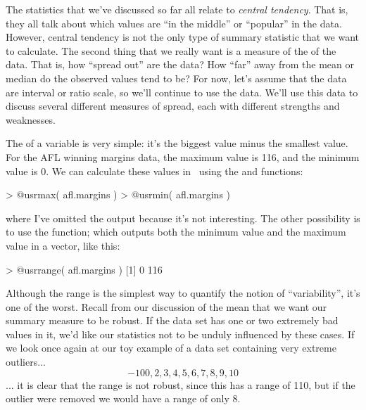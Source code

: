 The statistics that we've discussed so far all relate to {\it central tendency}. That is, they all talk about which values are ``in the middle'' or ``popular'' in the data. However, central tendency is not the only type of summary statistic that we want to calculate. The second thing that we really want is a measure of the  of the data. That is, how ``spread out'' are the data? How ``far'' away from the mean or median do the observed values tend to be? For now, let's assume that the data are interval or ratio scale, so we'll continue to use the  data.  We'll use this data to discuss several different measures of spread, each with different strengths and weaknesses. 


The  of a variable is very simple: it's the biggest value minus the smallest value. For the AFL winning margins data, the maximum value is 116, and the minimum value is 0. We can calculate these values in \R\ using the  and  functions:
\begin{rblock1}
> @usr{max( afl.margins )}
> @usr{min( afl.margins )}
\end{rblock1}
where I've omitted the output because it's not interesting. The other possibility is to use the  function; which outputs both the minimum value and the maximum value in a vector, like this:
\begin{rblock1}
> @usr{range( afl.margins )}
[1]   0 116
\end{rblock1}
Although the range is the simplest way to quantify the notion of ``variability'', it's one of the worst. Recall from our discussion of the mean that we want our summary measure to be robust. If the data set has one or two extremely bad values in it, we'd like our statistics not to be unduly influenced by these cases. If we look once again at our toy example of a data set containing very extreme outliers...
$$
-100,2,3,4,5,6,7,8,9,10
$$
... it is clear that the range is not robust, since this has a range of 110, but if the outlier were removed we would have a range of only 8.


